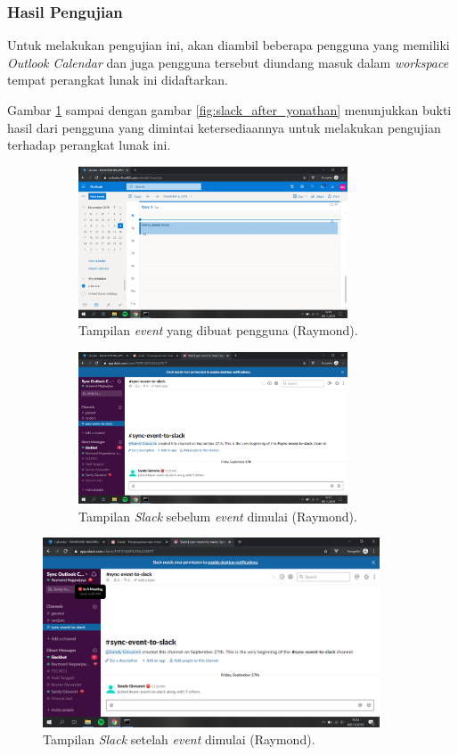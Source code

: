 \subsubsection{Hasil Pengujian}
Untuk melakukan pengujian ini, akan diambil beberapa pengguna yang memiliki \textit{Outlook Calendar} dan juga pengguna tersebut diundang masuk dalam \textit{workspace} tempat perangkat lunak ini didaftarkan.

Gambar \ref{fig:outlook_raymond} sampai dengan gambar \ref{fig:slack_after_yonathan} menunjukkan bukti hasil dari pengguna yang dimintai ketersediaannya untuk melakukan pengujian terhadap perangkat lunak ini. 

\begin{figure}[h]
\begin{subfigure}{8.5cm}
  \centering
  \includegraphics[width=8cm]{./Gambar/PengujianRaymond/Outlook.png}
  \caption{Tampilan \textit{event} yang dibuat pengguna (Raymond).}
  \label{fig:outlook_raymond}
\end{subfigure}
\begin{subfigure}{8.5cm}
  \centering
  \includegraphics[width=8cm]{./Gambar/PengujianRaymond/Slack_Before.png}
  \caption{Tampilan \textit{Slack} sebelum \textit{event} dimulai (Raymond).}
  \label{fig:slack_before_raymond}
\end{subfigure}
\caption{}
\end{figure}

\begin{figure}[h]
  \includegraphics[width=10cm]{./Gambar/PengujianRaymond/Slack_After.png}
  \centering
  \caption{Tampilan \textit{Slack} setelah \textit{event} dimulai (Raymond).}
  \label{fig:slack_after_raymond}
\end{figure}

